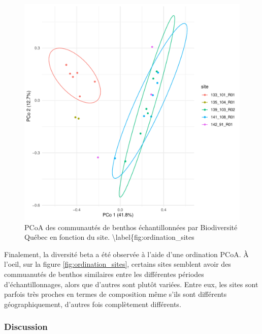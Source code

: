 \documentclass[9pt,twocolumn,twoside,]{pnas-new}
\begin{document}
\begin{figure}
\centering
\includegraphics{ordination_sites.pdf}
\caption{PCoA des communautés de benthos échantillonnées par
Biodiversité Québec en fonction du site.
\textbackslash label\{fig:ordination\_sites}
\end{figure}

Finalement, la diversité beta a été observée à l'aide d'une ordination
PCoA. À l'oeil, sur la figure \ref{fig:ordination_sites}, certains sites
semblent avoir des commuanutés de benthos similaires entre les
différentes périodes d'échantillonnages, alors que d'autres sont plutôt
variées. Entre eux, les sites sont parfois très proches en termes de
composition même s'ils sont différents géographiquement, d'autres fois
complètement différents.

\hypertarget{discussion}{%
\subsubsection*{Discussion}\label{discussion}}
\end{document}
